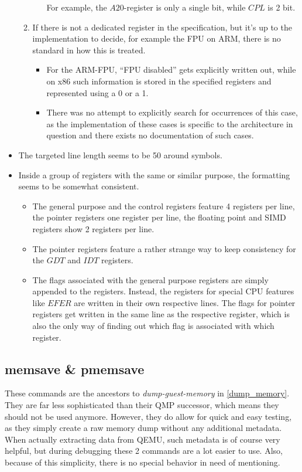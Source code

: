 \begin{itemize}
\begin{enumerate}
\begin{itemize}
      For example, the $A20$-register is only a single bit, while $CPL$ is 2 bit.
    \end{itemize}
    \item If there is not a dedicated register in the specification,
    but it's up to the implementation to decide,
    for example the FPU on ARM,
    there is no standard in how this is treated.
    \begin{itemize}
      \item For the ARM-FPU, \enquote{FPU disabled} gets explicitly written out,
      while on x86 such information is stored in the specified registers and represented using a 0 or a 1.
      \item There was no attempt to explicitly search for occurrences of this case,
      as the implementation of these cases is specific to the architecture in question
      and there exists no documentation of such cases.
    \end{itemize}
  \end{enumerate}
  \item The targeted line length seems to be 50 around symbols.
  \item Inside a group of registers with the same or similar purpose, the formatting seems to be somewhat consistent.
  \begin{itemize}
    \item The general purpose and the control registers feature 4 registers per line,
    the pointer registers one register per line, the floating point and SIMD registers show 2 registers per line.
    \item The pointer registers feature a rather strange way to keep consistency for the $GDT$ and $IDT$ registers.
    \item The flags associated with the general purpose registers are simply appended to the registers.
    Instead, the registers for special CPU features like $EFER$ are written in their own respective lines.
    The flags for pointer registers get written in the same line as the respective register,
    which is also the only way of finding out which flag is associated with which register.
  \end{itemize}
\end{itemize}

\subsection{memsave \& pmemsave}\label{sec:memsave}
These commands are the ancestors to \emph{dump-guest-memory} in \autoref{dump_memory}.
They are far less sophisticated than their QMP successor,
which means they should not be used anymore.
However, they do allow for quick and easy testing,
as they simply create a raw memory dump without any additional metadata.
When actually extracting data from QEMU, such metadata is of course very helpful,
but during debugging these 2 commands are a lot easier to use.
Also, because of this simplicity, there is no special behavior in need of mentioning.

